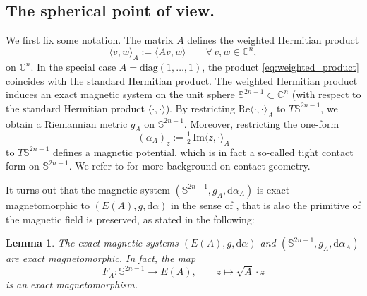 \documentclass[11pt,reqno]{amsart}
\renewcommand{\Im}{{\rm Im}}
\newcommand{\C}{\mathbb C}
\theoremstyle{plain}
\newtheorem{lem}[thm]{Lemma}
\theoremstyle{definition}
\numberwithin{equation}{section}
\def\d{\delta}
\def\d{\delta}
\def\d{{\mathrm{d}}}
\def\SS{{\mathbb{S}}}
\def\Re{{\mathrm{Re}}}
\def\Im{{\mathrm{Im}}}
\def\bar{\overline}
\begin{document}
\subsection{The spherical point of view.}\label{ss:The spherical point of view}
We first fix some notation. The matrix $A$ defines the weighted Hermitian product
\begin{equation}\label{eq:weighted_product}
\langle v, w \rangle_A := \langle Av, w \rangle 
\qquad \forall\, v,w \in \C^n ,
\end{equation}
on $\C^n$. In the special case $A=\mathrm{diag}(1,\ldots,1)$, the product \eqref{eq:weighted_product} coincides with the standard Hermitian product. The weighted Hermitian product induces an exact magnetic system on the unit sphere $\mathbb{S}^{2n-1}\subset\C^n$ (with respect to the standard Hermitian product $\langle\cdot,\cdot\rangle$). By restricting $\Re\langle\cdot,\cdot\rangle_A$ to $T\mathbb{S}^{2n-1}$, we obtain a Riemannian metric $g_A$ on $\mathbb{S}^{2n-1}$. Moreover, restricting the one-form
\[
(\alpha_A)_z := \tfrac12\,\Im\langle z,\cdot\rangle_A
\]
to $T\mathbb{S}^{2n-1}$ defines a magnetic potential, which is in fact a so-called tight contact form on $\mathbb{S}^{2n-1}$. We refer to \cite{Gg08} for more background on contact geometry.

It turns out that the magnetic system $(\mathbb{S}^{2n-1},g_A,\d\alpha_A)$ is exact magnetomorphic to $(E(A),g,\d\alpha)$ in the sense of , that is also the primitive of the magnetic field is preserved, as stated in the following:  

\begin{lem}\label{lem:mag_Sphere_ellipsoid}
The exact magnetic systems $(E(A), g, \d\alpha)$ and $(\mathbb{S}^{2n-1}, g_A, \d\alpha_A)$ are exact magnetomorphic. In fact, the map
\[
F_A : \SS^{2n-1} \longrightarrow E(A), 
\qquad 
z \mapsto \sqrt{A}\cdot z
\]
is an exact magnetomorphism. 
\end{lem}
\end{document}
